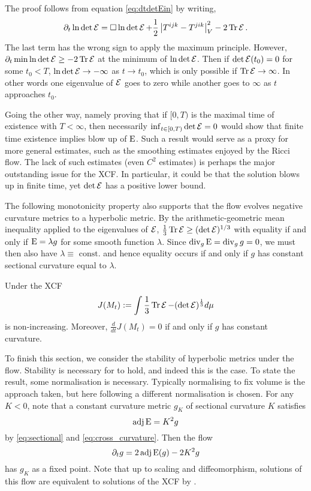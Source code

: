 \documentclass[a4paper,12pt]{amsart}
\begin{document}
The proof follows from equation \eqref{eq:dtdetEin} by writing,
\[
\partial_t \ln \det \operatorname{\mathcal{E}} = \Box \ln \det \operatorname{\mathcal{E}} + \frac{1}{2}\left\lvert{T^{ijk} - T^{jik}}\right\rvert_V^2- 2 \operatorname{Tr} \operatorname{\mathcal{E}}.
\]
The last term has the wrong sign to apply the maximum principle. However, \(\partial_t \min \ln \det\operatorname{\mathcal{E}} \geq -2 \operatorname{Tr} \operatorname{\mathcal{E}}\) at the minimum of \(\ln \det\operatorname{\mathcal{E}}\). Then if \(\det\operatorname{\mathcal{E}}(t_0)= 0\) for some $t_0<T$, \(\ln\det\operatorname{\mathcal{E}} \to -\infty\) as $t\to t_0$, which is only possible if \(\operatorname{Tr} \operatorname{\mathcal{E}} \to \infty\). In other words one eigenvalue of \(\operatorname{\mathcal{E}}\) goes to zero while another goes to \(\infty\) as $t$ approaches $t_0$.

Going the other way, namely proving that if \([0, T)\) is the maximal time of existence with \(T < \infty\), then necessarily \(\inf_{t \in [0, T)} \det \operatorname{\mathcal{E}} = 0\) would show that finite time existence implies blow up of \(\operatorname{E}\). Such a result would serve as a proxy for more general estimates, such as the smoothing estimates enjoyed by the Ricci flow. The lack of such estimates (even \(C^2\) estimates) is perhaps the major outstanding issue for the XCF. In particular, it could be that the solution blows up in finite time, yet \(\det \operatorname{\mathcal{E}}\) has a positive lower bound.

The following monotonicity property also supports  that the flow evolves negative curvature metrics to a hyperbolic metric. By the arithmetic-geometric mean inequality applied to the eigenvalues of \(\operatorname{\mathcal{E}}\), \(\tfrac{1}{3} \operatorname{Tr}\operatorname{\mathcal{E}} \geq (\det \operatorname{\mathcal{E}})^{1/3}\) with equality if and only if \(\operatorname{E} = \lambda g\) for some smooth function \(\lambda\). Since \(\operatorname{div}_g \operatorname{E} = \operatorname{div}_g g = 0\), we must then also have \(\lambda \equiv \text{ const.}\) and hence equality occurs if and only if \(g\) has constant sectional curvature equal to \(\lambda\).

\begin{thm}[{\cite[Theorem 8]{MR2055396}}]
\label{thm:hyperbolicity}
Under the XCF
\[J(M_t):=\int \frac{1}{3} \operatorname{Tr} \operatorname{\mathcal{E}} - (\det\operatorname{\mathcal{E}})^{\frac{1}{3}}d\mu\]
is non-increasing. Moreover, \(\frac{d}{dt}J(M_t) = 0\) if and only if $g$ has constant curvature.
\end{thm}

To finish this section, we consider the stability of hyperbolic metrics under the flow. Stability is necessary for  to hold, and indeed this is the case. To state the result, some normalisation is necessary. Typically normalising to fix volume is the approach taken, but here following \cite{MR2448593} a different normalisation is chosen. For any \(K < 0\), note that a constant curvature metric \(g_K\) of sectional curvature \(K\) satisfies
\[
\operatorname{adj}\operatorname{E} = K^2 g
\]
by \eqref{eq:sectional} and \eqref{eq:cross_curvature}. Then the flow
\[
\partial_t g = 2\operatorname{adj}\operatorname{E}(g) - 2K^2 g
\]
has \(g_K\) as a fixed point. Note that up to scaling and diffeomorphism, solutions of this flow are equivalent to solutions of the XCF by \cite[Lemma 1]{MR2448593}.
\end{document}
